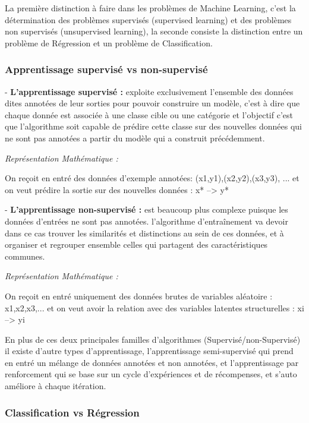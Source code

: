 La première distinction à faire dans les problèmes de Machine Learning, c'est la détermination des problèmes supervisés (supervised learning) et des problèmes non supervisés (unsupervised learning), la seconde consiste la distinction entre un problème de Régression et un problème de Classification.

\subsubsection{Apprentissage supervisé vs non-supervisé}


- \textbf{L'apprentissage supervisé : }exploite exclusivement l'ensemble des données dites annotées de leur sorties pour pouvoir construire un modèle, c'est à dire que chaque donnée est associée à une classe cible ou une catégorie et l'objectif c'est que l'algorithme soit capable de prédire cette classe sur des nouvelles données qui ne sont pas annotées a partir du modèle qui a construit précédemment.

\textit{Représentation Mathématique :} 
    
    On reçoit en entré des données d'exemple annotées:
    (x1,y1),(x2,y2),(x3,y3), ... et on veut prédire la sortie sur des nouvelles données :  x* --> y* 
    

- \textbf{L'apprentissage non-supervisé : } est beaucoup plus complexe puisque les données d'entrées ne sont pas annotées. l'algorithme d'entraînement va devoir dans ce cas  trouver  les similarités et distinctions au sein de ces données, et à organiser et regrouper ensemble celles qui partagent des caractéristiques communes.

\textit{Représentation Mathématique : }
    
    On reçoit en entré uniquement des données brutes de variables aléatoire : x1,x2,x3,... et on veut avoir la relation avec des variables latentes structurelles :  xi --> yi 
    
En plus de ces deux principales familles d'algorithmes (Supervisé/non-Supervisé) il existe d'autre types d'apprentissage, l'apprentissage semi-supervisé qui prend en entré un mélange de données annotées et non annotées, et l'apprentissage par renforcement qui se base sur un cycle d'expériences et de récompenses, et s'auto améliore à chaque itération.

\subsubsection{Classification vs Régression }


